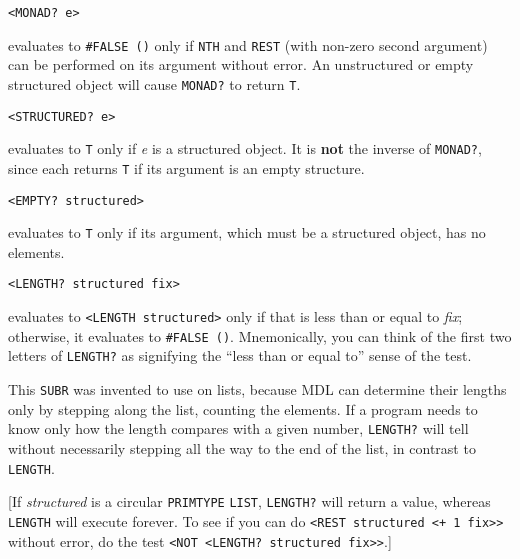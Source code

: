 \documentclass[a4paper,]{article}
\begin{document}
\begin{verbatim}
<MONAD? e>
\end{verbatim}

 evaluates to \texttt{\#FALSE\ ()} only if \texttt{NTH} and
\texttt{REST} (with non-zero second argument) can be performed on its argument without error. An
unstructured or empty structured object will cause \texttt{MONAD?} to return \texttt{T}.

\begin{verbatim}
<STRUCTURED? e>
\end{verbatim}

 evaluates to \texttt{T} only if \emph{e} is a structured object. It is \textbf{not} the
inverse of \texttt{MONAD?}, since each returns \texttt{T} if its argument is an empty structure.

\begin{verbatim}
<EMPTY? structured>
\end{verbatim}

 evaluates to \texttt{T} only if its argument, which must be a structured object, has no
elements.

\begin{verbatim}
<LENGTH? structured fix>
\end{verbatim}

 evaluates to \texttt{\textless{}LENGTH\ structured\textgreater{}}
only if that is less than or equal to \emph{fix}; otherwise, it evaluates to \texttt{\#FALSE\ ()}. Mnemonically, you can
think of the first two letters of \texttt{LENGTH?} as signifying the ``less than or equal to'' sense of the test.

This \texttt{SUBR} was invented to use on lists, because MDL can determine their lengths only by stepping along the list,
counting the elements. If a program needs to know only how the length compares with a given number, \texttt{LENGTH?} will
tell without necessarily stepping all the way to the end of the list, in contrast to \texttt{LENGTH}.

{[}If \emph{structured} is a circular \texttt{PRIMTYPE} \texttt{LIST}, \texttt{LENGTH?} will return a value, whereas
\texttt{LENGTH} will execute forever. To see if you can do
\texttt{\textless{}REST\ structured\ \textless{}+\ 1\ fix\textgreater{}\textgreater{}} without error, do the test
\texttt{\textless{}NOT\ \textless{}LENGTH?\ structured\ fix\textgreater{}\textgreater{}}.{]}
\end{document}
